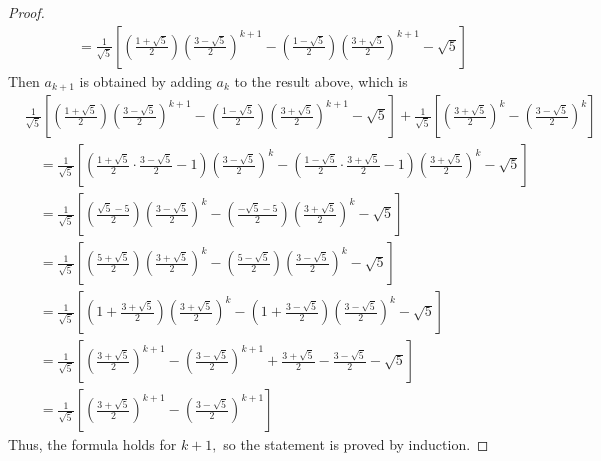 \documentclass{article}
\begin{document}
\begin{itemize}
\begin{enumerate}[(a)]
\begin{proof}
\begin{align*}
						&\quad = \frac{1}{\sqrt{5}}\left[ \left( \frac{1+\sqrt{5}}{2} \right) \left( \frac{3-\sqrt{5}}{2} \right)^{k+1}- \left( \frac{1-\sqrt{5}}{2} \right)\left( \frac{3+\sqrt{5}}{2} \right)^{k+1} - \sqrt{5}\right]
					\end{align*}
					Then $a_{k+1}$ is obtained by adding $a_k$ to the result above, which is
					\begin{align*}
						&\frac{1}{\sqrt{5}}\left[ \left( \frac{1+\sqrt{5}}{2} \right) \left( \frac{3-\sqrt{5}}{2} \right)^{k+1}- \left( \frac{1-\sqrt{5}}{2} \right)\left( \frac{3+\sqrt{5}}{2} \right)^{k+1} - \sqrt{5}\right] + \frac{1}{\sqrt{5}} \left[ \left( \frac{3+\sqrt{5}}{2}  \right)^k - \left( \frac{3-\sqrt{5}}{2} \right)^k\right] \\
						&\quad=\frac{1}{\sqrt{5}}\left[ \left( \frac{1+\sqrt{5}}{2}\cdot \frac{3-\sqrt{5}}{2} - 1 \right)\left( \frac{3-\sqrt{5}}{2} \right)^k - \left( \frac{1-\sqrt{5}}{2}\cdot \frac{3+\sqrt{5}}{2} -1 \right)\left( \frac{3+\sqrt{5}}{2} \right)^k - \sqrt{5}\right] \\
						&\quad= \frac{1}{\sqrt{5}}\left[ \left( \frac{\sqrt{5}-5}{2} \right)\left( \frac{3-\sqrt{5}}{2} \right)^k - \left( \frac{-\sqrt{5}-5}{2} \right)\left( \frac{3+\sqrt{5}}{2} \right)^k - \sqrt{5} \right] \\
						&\quad= \frac{1}{\sqrt{5}}\left[ \left( \frac{5+\sqrt{5}}{2} \right)\left( \frac{3+\sqrt{5}}{2} \right)^k - \left( \frac{5-\sqrt{5}}{2} \right)\left( \frac{3-\sqrt{5}}{2} \right)^k - \sqrt{5} \right] \\
						&\quad= \frac{1}{\sqrt{5}}\left[ \left( 1+\frac{3+\sqrt{5}}{2} \right)\left( \frac{3+\sqrt{5}}{2} \right)^k - \left( 1+\frac{3-\sqrt{5}}{2} \right)\left( \frac{3-\sqrt{5}}{2} \right)^k - \sqrt{5} \right] \\
						&\quad= \frac{1}{\sqrt{5}}\left[ \left( \frac{3+\sqrt{5}}{2} \right)^{k+1} - \left( \frac{3-\sqrt{5}}{2} \right)^{k+1} + \frac{3+\sqrt{5}}{2} - \frac{3-\sqrt{5}}{2} - \sqrt{5} \right] \\
						&\quad= \frac{1}{\sqrt{5}}\left[ \left( \frac{3+\sqrt{5}}{2} \right)^{k+1} - \left( \frac{3-\sqrt{5}}{2} \right)^{k+1} \right]
					\end{align*}
					Thus, the formula holds for $k+1,$ so the statement is proved by induction.
				\end{proof}
				
		\end{enumerate}


\end{itemize}
\end{document}

